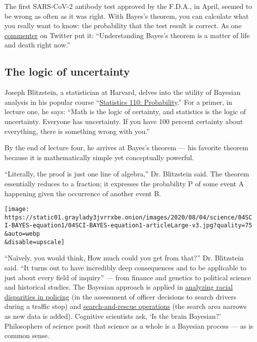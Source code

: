The first SARS-CoV-2 antibody test approved by the F.D.A., in April,
seemed to be wrong as often as it was right. With Bayes's theorem, you
can calculate what you really want to know: the probability that the
test result is correct. As one
\href{https://twitter.com/Riderius/status/1246172832071135236}{commenter}
on Twitter put it: ``Understanding Bayes's theorem is a matter of life
and death right now.''

\hypertarget{the-logic-of-uncertainty}{%
\subsection{The logic of uncertainty}\label{the-logic-of-uncertainty}}

Joseph Blitzstein, a statistician at Harvard, delves into the utility of
Bayesian analysis in his popular course
``\href{https://www.youtube.com/playlist?list=PL2SOU6wwxB0uwwH80KTQ6ht66KWxbzTIo}{Statistics
110: Probability}.'' For a primer, in lecture one, he says: ``Math is
the logic of certainty, and statistics is the logic of uncertainty.
Everyone has uncertainty. If you have 100 percent certainty about
everything, there is something wrong with you.''

By the end of lecture four, he arrives at Bayes's theorem --- his
favorite theorem because it is mathematically simple yet conceptually
powerful.

``Literally, the proof is just one line of algebra,'' Dr. Blitzstein
said. The theorem essentially reduces to a fraction; it expresses the
probability P of some event A happening given the occurrence of another
event B.

\texttt{[image: https://static01.graylady3jvrrxbe.onion/images/2020/08/04/science/04SCI-BAYES-equation1/04SCI-BAYES-equation1-articleLarge-v3.jpg?quality=75\\\&auto=webp\\\&disable=upscale]}

``Naïvely, you would think, How much could you get from that?'' Dr.
Blitzstein said. ``It turns out to have incredibly deep consequences and
to be applicable to just about every field of inquiry'' --- from finance
and genetics to political science and historical studies. The Bayesian
approach is applied in
\href{https://www.nature.com/articles/s41562-020-0858-1}{analyzing
racial disparities in policing} (in the assessment of officer decisions
to search drivers during a traffic stop) and
\href{https://www.nytimes3xbfgragh.onion/2014/09/30/science/the-odds-continually-updated.html}{search-and-rescue
operations} (the search area narrows as new data is added). Cognitive
scientists ask, `Is the brain Bayesian?' Philosophers of science posit
that science as a whole is a Bayesian process --- as is common sense.

